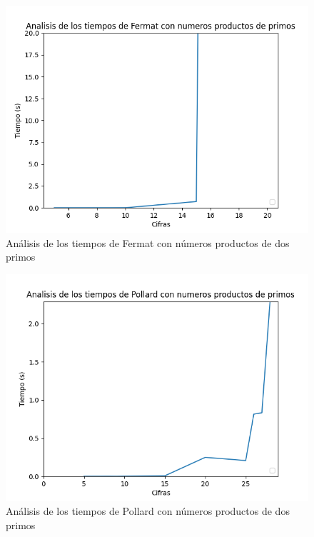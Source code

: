 \documentclass{article}
\begin{document}
    \begin{figure}[ht!]
        \centering
        \includegraphics[scale=0.3]{Figure_4}
        \caption{Análisis de los tiempos de Fermat con números productos de dos primos}
        \label{fig:Figure_4}
    \end{figure}
    
    \begin{figure}[ht!]
        \centering
        \includegraphics[scale=0.3]{Figure_6}
        \caption{Análisis de los tiempos de Pollard con números productos de dos primos}
        \label{fig:Figure_6}
    \end{figure}
\end{document}
